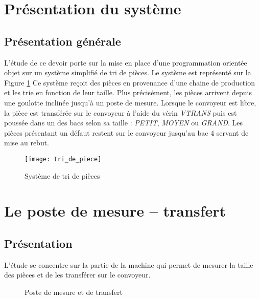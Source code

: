 
\section{Présentation du système}
\subsection{Présentation générale}
L'étude de ce devoir porte sur la mise en place d'une programmation orientée objet sur un système simplifié de tri de pièces.
Le système est représenté sur la Figure \ref{fig:tri_de_piece} Ce système reçoit des pièces en provenance d'une chaine de production et les trie en fonction de leur taille. Plus précisément, les pièces arrivent depuis une goulotte inclinée jusqu'à un poste de mesure. Lorsque le convoyeur est libre, la pièce est transférée sur le convoyeur à l'aide du vérin \emph{VTRANS} puis est poussée dans un des bacs selon sa taille : \emph{PETIT}, \emph{MOYEN} ou \emph{GRAND}. Les pièces présentant un défaut restent sur le convoyeur jusqu'au bac 4 servant de mise au rebut.

\begin{figure}[h!t]
    \centering
    \texttt{[image: tri\_de\_piece]}
    \caption{Système de tri de pièces}
    \label{fig:tri_de_piece}
\end{figure}

\pagebreak
\section{Le poste de mesure -- transfert}
\subsection{Présentation}
L'étude se concentre sur la partie de la machine qui permet de mesurer la taille des pièces et de les transférer sur le convoyeur.

\begin{figure}
    \centering
    \caption{Poste de mesure et de transfert}
    \label{fig:poste_mesure}
\end{figure}

